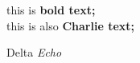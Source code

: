 \documentclass{article}
\begin{document}
\begin{DefineCode}
this is \textbf{bold text;}\\
this is also {\bfseries Charlie text;}
\end{DefineCode}

\begin{DefineCode}
Delta \emph{Echo}
\end{DefineCode}
\end{document}
